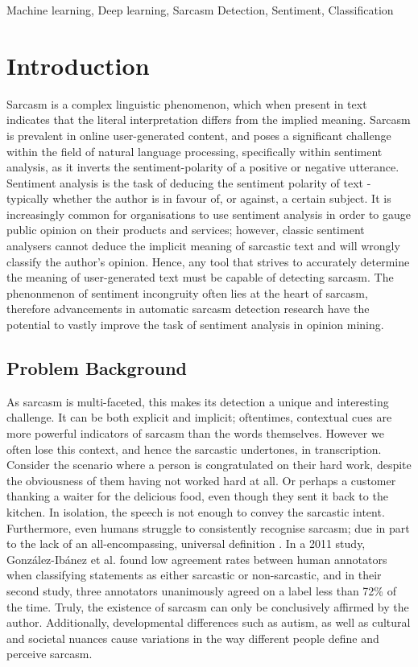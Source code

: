 \documentclass[12pt,a4paper]{article}
\begin{document}
\begin{keywords}
Machine learning, Deep learning, Sarcasm Detection, Sentiment, Classification
\end{keywords}


\section{Introduction}
\noindent Sarcasm is a complex linguistic phenomenon, which when present in text indicates that the literal interpretation differs from the implied meaning. Sarcasm is prevalent in online user-generated content, and poses a significant challenge within the field of natural language processing, specifically within sentiment analysis, as it inverts the sentiment-polarity of a positive or negative utterance. Sentiment analysis is the task of deducing the sentiment polarity of text - typically whether the author is in favour of, or against, a certain subject. It is increasingly common for organisations to use sentiment analysis in order to gauge public opinion on their products and services; however, classic sentiment analysers cannot deduce the implicit meaning of sarcastic text and will wrongly classify the author's opinion. Hence, any tool that strives to accurately determine the meaning of user-generated text must be capable of detecting sarcasm. The phenonmenon of sentiment incongruity often lies at the heart of sarcasm, therefore advancements in automatic sarcasm detection research have the potential to vastly improve the task of sentiment analysis in opinion mining.


\subsection{Problem Background}
\noindent As sarcasm is multi-faceted, this makes its detection a unique and interesting challenge. It can be both explicit and implicit; oftentimes, contextual cues are more powerful indicators of sarcasm than the words themselves. However we often lose this context, and hence the sarcastic undertones, in transcription. Consider the scenario where a person is congratulated on their hard work, despite the obviousness of them having not worked hard at all. Or perhaps a customer thanking a waiter for the delicious food, even though they sent it back to the kitchen. In isolation, the speech is not enough to convey the sarcastic intent. Furthermore, even humans struggle to consistently recognise sarcasm; due in part to the lack of an all-encompassing, universal definition
. In a 2011 study, Gonz{\'a}lez-Ib{\'a}nez et al. \cite{gonzalez2011identifying} found low agreement rates between human annotators when classifying statements as either sarcastic or non-sarcastic, and in their second study, three annotators unanimously agreed on a label less than 72\% of the time. Truly, the existence of sarcasm can only be conclusively affirmed by the author. Additionally, developmental differences such as autism, as well as cultural and societal nuances cause variations in the way different people define and perceive sarcasm.
\end{document}
